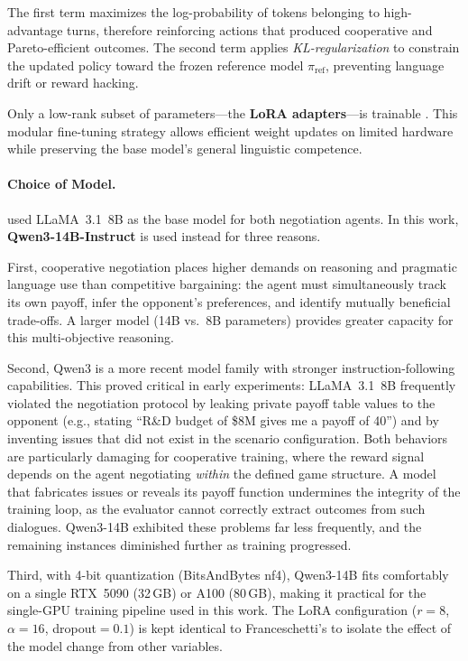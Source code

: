 \documentclass[12pt,a4paper]{article}
\begin{document}
The first term maximizes the log-probability of tokens belonging to high-advantage turns, therefore reinforcing actions that produced cooperative and Pareto-efficient outcomes. The second term applies \textit{KL-regularization} to constrain the updated policy toward the frozen reference model $\pi_{\mathrm{ref}}$, preventing language drift or reward hacking.

Only a low-rank subset of parameters---the \textbf{LoRA adapters}---is trainable \citep{hu2021loralowrankadaptationlarge}. This modular fine-tuning strategy allows efficient weight updates on limited hardware while preserving the base model's general linguistic competence.

\paragraph{Choice of Model.}
\citet{franceschetti2025advantage} used LLaMA~3.1~8B as the base model for both negotiation agents. In this work, \textbf{Qwen3-14B-Instruct} is used instead for three reasons.

First, cooperative negotiation places higher demands on reasoning and pragmatic language use than competitive bargaining: the agent must simultaneously track its own payoff, infer the opponent's preferences, and identify mutually beneficial trade-offs. A larger model (14B vs.\ 8B parameters) provides greater capacity for this multi-objective reasoning.

Second, Qwen3 is a more recent model family with stronger instruction-following capabilities. This proved critical in early experiments: LLaMA~3.1~8B frequently violated the negotiation protocol by leaking private payoff table values to the opponent (e.g., stating ``R\&D budget of \$8M gives me a payoff of 40'') and by inventing issues that did not exist in the scenario configuration. Both behaviors are particularly damaging for cooperative training, where the reward signal depends on the agent negotiating \textit{within} the defined game structure. A model that fabricates issues or reveals its payoff function undermines the integrity of the training loop, as the evaluator cannot correctly extract outcomes from such dialogues. Qwen3-14B exhibited these problems far less frequently, and the remaining instances diminished further as training progressed.

Third, with 4-bit quantization (BitsAndBytes nf4), Qwen3-14B fits comfortably on a single RTX~5090 (32\,GB) or A100 (80\,GB), making it practical for the single-GPU training pipeline used in this work. The LoRA configuration ($r=8$, $\alpha=16$, dropout$=0.1$) is kept identical to Franceschetti's to isolate the effect of the model change from other variables.
\end{document}
